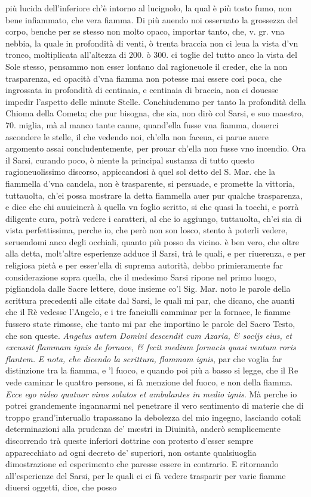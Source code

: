 \documentclass[11pt,twoside,openany]{book}
\begin{document}
più lucida dell'inferiore ch'è intorno al lucignolo, la qual è più tosto fumo, non bene infiammato, che vera fiamma. Di più auendo noi osseruato la grossezza del corpo, benche per se stesso non molto opaco, importar tanto, che, v. gr. vna nebbia, la quale in profondità di venti, ò trenta braccia non ci leua la vista d'vn tronco, moltiplicata all'altezza di 200. ò 300. ci toglie del tutto anco la vista del Sole stesso, pensammo non esser lontano dal ragioneuole il creder, che la non trasparenza, ed opacità d'vna fiamma non potesse mai essere così poca, che ingrossata in profondità di centinaia, e centinaia di braccia, non ci douesse impedir l'aspetto delle minute Stelle. Conchiudemmo per tanto la profondità della Chioma della Cometa; che pur bisogna, che sia, non dirò col Sarsi, e suo maestro, 70. miglia, mà al manco tante canne, quand'ella fusse vna fiamma, douerci ascondere le stelle, il che vedendo noi, ch'ella non faceua, ci parue auere argomento assai concludentemente, per prouar ch'ella non fusse vno incendio. Ora il Sarsi, curando poco, ò niente la principal sustanza di tutto questo ragioneuolissimo discorso, appiccandosi à quel sol detto del S. Mar. che la fiammella d'vna candela, non è trasparente, si persuade, e promette la vittoria, tuttauolta, ch'ei possa mostrare la detta fiammella auer pur qualche trasparenza, e dice che chi auuicinerà à quella vn foglio scritto, si che quasi la tocchi, e porrà diligente cura, potrà vedere i caratteri, al che io aggiungo, tuttauolta, ch'ei sia di vista perfettissima, perche io, che però non son losco, stento à poterli vedere, seruendomi anco degli occhiali, quanto più posso da vicino. è ben vero, che oltre alla detta, molt'altre esperienze adduce il Sarsi, trà le quali, e per riuerenza, e per religiosa pietà e per esser'ella di suprema autorità, debbo primieramente far considerazione sopra quella, che il medesimo Sarsi ripone nel primo luogo, pigliandola dalle Sacre lettere, doue insieme co'l Sig. Mar. noto le parole della scrittura precedenti alle citate dal Sarsi, le quali mi par, che dicano, che auanti che il Rè vedesse l'Angelo, e i tre fanciulli camminar per la fornace, le fiamme fussero state rimosse, che tanto mi par che importino le parole del Sacro Testo, che son queste. \textit{Angelus autem Domini descendit cum Azaria, \& socijs eius, et excussit flammam ignis de fornace, \& fecit medium fornacis quasi ventum roris flantem. }\textit{E nota, che dicendo la scrittura,}\textit{ flammam ignis}, par che voglia far distinzione tra la fiamma, e 'l fuoco, e quando poi più a basso si legge, che il Re vede caminar le quattro persone, si fà menzione del fuoco, e non della fiamma. \textit{Ecce ego video quatuor viros solutos et ambulantes in medio ignis}. Mà perche io potrei grandemente ingannarmi nel penetrare il vero sentimento di materie che di troppo grand'interuallo trapassano la debolezza del mio ingegno, lasciando cotali determinazioni alla prudenza de' mæstri in Diuinità, anderò semplicemente discorrendo trà queste inferiori dottrine con protesto d'esser sempre apparecchiato ad ogni decreto de' superiori, non ostante qualsiuoglia dimostrazione ed esperimento che paresse essere in contrario. E ritornando all'esperienze del Sarsi, per le quali ei ci fà vedere trasparir per varie fiamme diuersi oggetti, dice, che posso 
\end{document}
